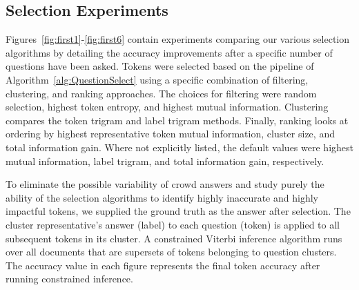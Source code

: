 \subsection{Selection Experiments}


Figures~\ref{fig:first1}-\ref{fig:first6} contain experiments comparing our various selection algorithms by detailing the accuracy improvements after a specific number of questions have been asked.  Tokens were selected based on the pipeline of Algorithm~\ref{alg:QuestionSelect} using a specific combination of filtering, clustering, and ranking approaches.  The choices for filtering were random selection, highest token entropy, and highest mutual information.  Clustering compares the token trigram and label trigram methods.  Finally, ranking looks at ordering by highest representative token mutual information, cluster size, and total information gain.  Where not explicitly listed, the default values were highest mutual information, label trigram, and total information gain, respectively.

To eliminate the possible variability of crowd answers and study purely the ability of the selection algorithms to identify highly inaccurate and highly impactful tokens, we supplied the ground truth as the answer after selection.  The cluster representative's answer (label) to each question (token) is applied to all subsequent tokens in its cluster.  A constrained Viterbi inference algorithm runs over all documents that are supersets of tokens belonging to question clusters.  The accuracy value in each figure represents the final token accuracy after running constrained inference.


